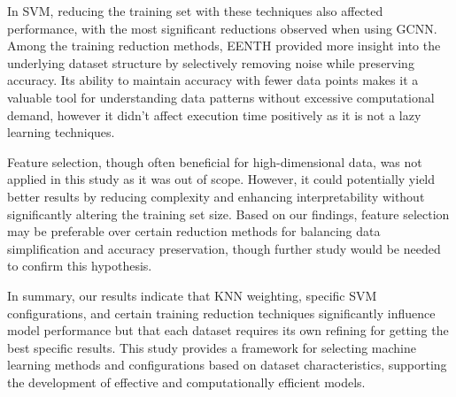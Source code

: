 In SVM, reducing the training set with these techniques also affected performance, with the most significant reductions observed when using GCNN. Among the training reduction methods, EENTH provided more insight into the underlying dataset structure by selectively removing noise while preserving accuracy. Its ability to maintain accuracy with fewer data points makes it a valuable tool for understanding data patterns without excessive computational demand, however it didn't affect execution time positively as it is not a lazy learning techniques.

Feature selection, though often beneficial for high-dimensional data, was not applied in this study as it was out of scope. However, it could potentially yield better results by reducing complexity and enhancing interpretability without significantly altering the training set size. Based on our findings, feature selection may be preferable over certain reduction methods for balancing data simplification and accuracy preservation, though further study would be needed to confirm this hypothesis.

In summary, our results indicate that KNN weighting, specific SVM configurations, and certain training reduction techniques significantly influence model performance but that each dataset requires its own refining for getting the best specific results. This study provides a framework for selecting machine learning methods and configurations based on dataset characteristics, supporting the development of effective and computationally efficient models.